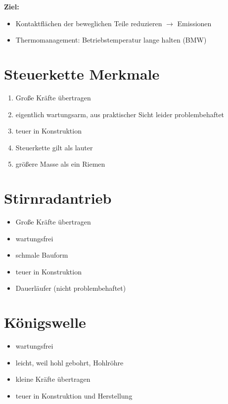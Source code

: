 \textbf{Ziel:}

\begin{itemize}
\item
  Kontaktflächen der beweglichen Teile reduzieren $\to$ Emissionen
\item
  Thermomanagement: Betriebstemperatur lange halten (BMW)
\end{itemize}

\section{Steuerkette Merkmale}\label{steuerkette-merkmale}

\begin{enumerate}
\item
  Große Kräfte übertragen
\item
  eigentlich wartungsarm, aus praktischer Sicht leider problembehaftet
\item
  teuer in Konstruktion
\item
  Steuerkette gilt als lauter
\item
  größere Masse als ein Riemen
\end{enumerate}

\section{Stirnradantrieb}\label{stirnradantrieb}

\begin{itemize}
\item
  Große Kräfte übertragen
\item
  wartungsfrei
\item
  schmale Bauform
\item
  teuer in Konstruktion
\item
  Dauerläufer (nicht problembehaftet)
\end{itemize}

\section{Königswelle}\label{koenigswelle}

\begin{itemize}
\item
  wartungsfrei
\item
  leicht, weil hohl gebohrt, Hohlröhre
\item
  kleine Kräfte übertragen
\item
  teuer in Konstruktion und Herstellung
\end{itemize}

